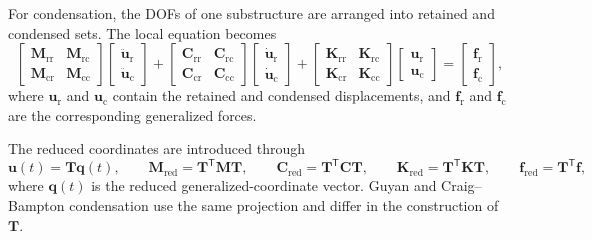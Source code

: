 \documentclass[11pt]{article}
\begin{document}
For condensation, the DOFs of one substructure are arranged into retained and condensed sets. The local equation becomes
\begin{equation}
\begin{bmatrix}
\mathbf{M}_{\mathrm{rr}} & \mathbf{M}_{\mathrm{rc}}\\
\mathbf{M}_{\mathrm{cr}} & \mathbf{M}_{\mathrm{cc}}
\end{bmatrix}
\begin{bmatrix}
\ddot{\bm{u}}_{\mathrm{r}}\\
\ddot{\bm{u}}_{\mathrm{c}}
\end{bmatrix}
+
\begin{bmatrix}
\mathbf{C}_{\mathrm{rr}} & \mathbf{C}_{\mathrm{rc}}\\
\mathbf{C}_{\mathrm{cr}} & \mathbf{C}_{\mathrm{cc}}
\end{bmatrix}
\begin{bmatrix}
\dot{\bm{u}}_{\mathrm{r}}\\
\dot{\bm{u}}_{\mathrm{c}}
\end{bmatrix}
+
\begin{bmatrix}
\mathbf{K}_{\mathrm{rr}} & \mathbf{K}_{\mathrm{rc}}\\
\mathbf{K}_{\mathrm{cr}} & \mathbf{K}_{\mathrm{cc}}
\end{bmatrix}
\begin{bmatrix}
\bm{u}_{\mathrm{r}}\\
\bm{u}_{\mathrm{c}}
\end{bmatrix}
=
\begin{bmatrix}
\bm{f}_{\mathrm{r}}\\
\bm{f}_{\mathrm{c}}
\end{bmatrix},
\label{eq:partitioned-local-eom}
\end{equation}
where \(\bm{u}_{\mathrm{r}}\) and \(\bm{u}_{\mathrm{c}}\) contain the retained and condensed displacements, and \(\bm{f}_{\mathrm{r}}\) and \(\bm{f}_{\mathrm{c}}\) are the corresponding generalized forces.

The reduced coordinates are introduced through
\begin{equation}
    \bm{u}(t)=\mathbf{T}\bm{q}(t),
    \qquad
    \mathbf{M}_{\mathrm{red}}=\mathbf{T}^{\mathsf{T}}\mathbf{M}\mathbf{T},
    \qquad
    \mathbf{C}_{\mathrm{red}}=\mathbf{T}^{\mathsf{T}}\mathbf{C}\mathbf{T},
    \qquad
    \mathbf{K}_{\mathrm{red}}=\mathbf{T}^{\mathsf{T}}\mathbf{K}\mathbf{T},
    \qquad
    \bm{f}_{\mathrm{red}}=\mathbf{T}^{\mathsf{T}}\bm{f},
    \label{eq:general-projection}
\end{equation}
where \(\bm{q}(t)\) is the reduced generalized-coordinate vector. Guyan and Craig--Bampton condensation use the same projection and differ in the construction of \(\mathbf{T}\).
\end{document}
